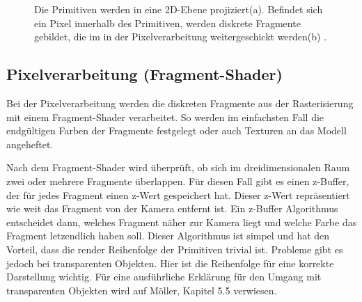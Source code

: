 \begin{figure}[hbt!]
    \centering
    \qquad
    \caption{Die Primitiven werden in eine 2D-Ebene projiziert(a). Befindet sich ein Pixel innerhalb des Primitiven, werden diskrete Fragmente gebildet, die im in der Pixelverarbeitung weitergeschickt werden(b) \cite*[][, zuletzt aufgerufen am 11.07.2022]{scratchapixel}.}%
    \label{fig:rendering-pipeline-rasterisierung-beispiel}
\end{figure}

\subsection{Pixelverarbeitung (Fragment-Shader)}
\label{grp-pixelverarbeitung}
Bei der Pixelverarbeitung werden die diskreten Fragmente aus der Rasterisierung mit einem Fragment-Shader verarbeitet. So werden im einfachsten Fall die endgültigen Farben der Fragmente festgelegt oder auch Texturen an das Modell angeheftet. 

Nach dem Fragment-Shader wird überprüft, ob sich im dreidimensionalen Raum zwei oder mehrere Fragmente überlappen. Für diesen Fall gibt es einen z-Buffer, der für jedes Fragment einen z-Wert gespeichert hat. Dieser z-Wert repräsentiert wie weit das Fragment von der Kamera entfernt ist. Ein z-Buffer Algorithmus entscheidet dann, welches Fragment näher zur Kamera liegt und welche Farbe das Fragment letzendlich haben soll. Dieser Algorithmus ist simpel und hat den Vorteil, dass die render Reihenfolge der Primitiven trivial ist. Probleme gibt es jedoch bei transparenten Objekten. Hier ist die Reihenfolge für eine korrekte Darstellung wichtig\cite*[Moeller (2019) S.21f.,][]{moeller2019}. Für eine ausführliche Erklärung für den Umgang mit transparenten Objekten wird auf Möller, Kapitel 5.5 verwiesen\cite*[Moeller (2019) S.148ff.,][]{moeller2019}.